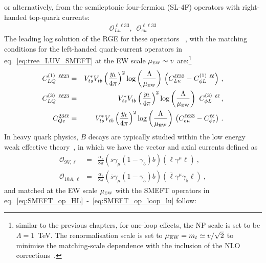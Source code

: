 or alternatively, from the semileptonic four-fermion (SL-4F) operators with right-handed top-quark currents:
\begin{eqnarray} 
	\label{eq:SMEFT_op_loop_lu}
		\mathcal{O}_{Lu}^{\ell \ell 3 3}, \,	\,\,	\mathcal{O}_{eu}^{\ell \ell 3 3} 
\end{eqnarray}
The leading log solution of the RGE for these operators ~\cite{Jenkins:2013zja,Jenkins:2013wua}, with the matching conditions for the left-handed quark-current operators in eq.~\eqref{eq:tree_LUV_SMEFT} at the  EW scale $\mu_{\textrm{\tiny{EW}}}\sim v $ are:\footnote{similar to the previous chapters, for one-loop effects,  the NP scale is set to be $\Lambda = 1$~TeV.  The renormalisation scale is set to $\mu_{\rm EW} = m_t\simeq v/\sqrt{2}$ to minimise the matching-scale dependence with the inclusion of the NLO	 corrections~\cite{Aebischer:2015fzz,Bobeth:2017xry}.}
\begin{eqnarray}
	\label{eq:SMEFT_matching_1loop}
	C_{LQ}^{(1)}\ ^{\ell \ell 23} &=& V_{ts}^{*} V^{ }_{tb} \left(\frac{y_{t} }{4 \pi}\right)^2 \log \left( \frac{\Lambda}{\mu_{\textrm{\tiny{EW}}}} \right)   \, \left(C_{Lu}^{\ell \ell 3 3} - C_{\phi L}^{(1)}\ ^{\ell \ell} \right)\,,\nonumber \\
		C_{LQ}^{(3)}\ ^{\ell \ell 23} &=& V_{ts}^{*} V^{ }_{tb} \left(\frac{y_{t} }{4 \pi}\right)^2 \log \left( \frac{\Lambda}{\mu_{\textrm{\tiny{EW}}}} \right)  \ C_{\phi L}^{(3)}\ ^{\ell \ell}  \,,\nonumber \\
	C_{Qe}^{23\ell \ell} &=& V_{ts}^{*} V^{ }_{tb} \left(\frac{y_{t} }{4 \pi}\right)^2 \log \left( \frac{\Lambda}{\mu_{\textrm{\tiny{EW}}}} \right)   \, \left( C_{eu}^{\ell \ell 3 3} - C^{\ell \ell}_{\phi e}\right) \, .
\end{eqnarray}
In heavy quark physics, $B$ decays are typically studied within the low energy weak effective theory~\cite{Buchalla:1995vs,Buras:1998raa,Silvestrini:2019sey}, in which we have the vector and axial currents defined as
\begin{eqnarray}
	\label{eq:_Q9_Q10}
	\mathcal{O}_{9 V, \ell} & = & \frac{\alpha_{e}}{8 \pi} (\bar{s} \gamma_{\mu} (1-\gamma_{5})b) ( \bar{\ell} \gamma^{\mu} \ell ) \nonumber \ , \ \\
	\mathcal{O}_{10 A, \ell} & = & \frac{\alpha_{e}}{8 \pi} (\bar{s} \gamma_{\mu} (1-\gamma_{5})b) ( \bar{\ell} \gamma^{\mu} \gamma_{5} \ell ) \ ,
\end{eqnarray}
and matched at the EW scale $\mu_{\textrm{\tiny{EW}}}$  with the SMEFT operators in  eq.~\eqref{eq:SMEFT_op_HL}~-~\eqref{eq:SMEFT_op_loop_lu} follow:
